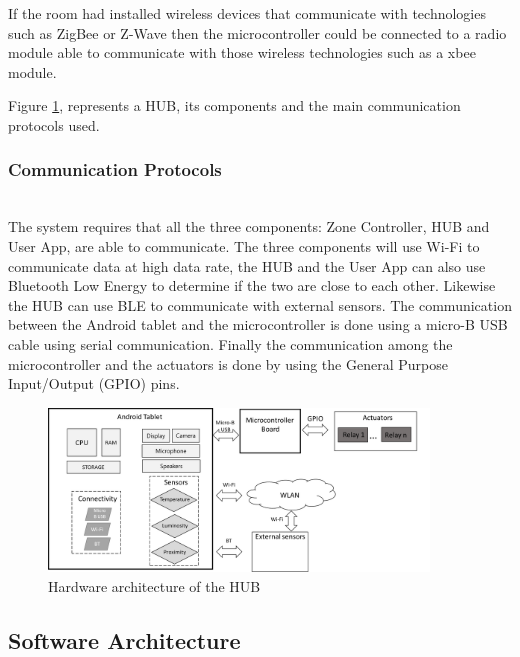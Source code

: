 If the room had installed wireless devices that communicate with technologies such as ZigBee or Z-Wave then the microcontroller could be connected to a radio module able to communicate with those wireless technologies such as a xbee module.


Figure \ref{architecture_system}, represents a HUB, its components and the main communication protocols used.

 

\subsubsection{Communication Protocols}\mbox{}\\

The system requires that all the three components: Zone Controller, HUB and User App, are able to communicate. The three components will use Wi-Fi to communicate data at high data rate, the HUB and the User App can also use Bluetooth Low Energy to determine if the two are close to each other. Likewise the HUB can use BLE to communicate with external sensors. The communication between the Android tablet and the microcontroller is done using a micro-B USB cable using serial communication. Finally the communication among the microcontroller and the actuators is done by using the General Purpose Input/Output (GPIO) pins.




\begin{figure}[h]
\centering
\includegraphics[width=0.9\textwidth]{Figures/hardware}
\caption{Hardware architecture of the HUB}
\label{architecture_system}
\end{figure}


\subsection{Software Architecture}\label{architecture4} 


